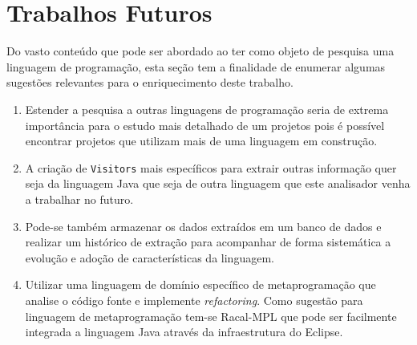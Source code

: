 

\section{Trabalhos Futuros}
Do vasto conte\'{u}do que pode ser abordado ao ter como objeto de pesquisa uma linguagem de programa\c{c}\~{a}o,  esta se\c{c}\~{a}o tem a finalidade de enumerar algumas sugest\~{o}es relevantes para o enriquecimento deste trabalho.

\begin{enumerate}
	\item Estender a pesquisa a outras linguagens de programa\c{c}\~{a}o seria de extrema import\^{a}ncia para o estudo mais detalhado de um projetos pois \'{e} poss\'{i}vel encontrar projetos que utilizam mais de uma linguagem em constru\c{c}\~{a}o.

	\item A cria\c{c}\~{a}o de \texttt{Visitors} mais espec\'{i}ficos para extrair outras informa\c{c}\~{a}o quer seja da linguagem Java que seja de outra linguagem que este analisador venha a trabalhar no futuro.

	\item Pode-se tamb\'{e}m armazenar os dados extra\'{i}dos em um banco de dados e realizar um hist\'{o}rico de extra\c{c}\~{a}o para acompanhar de forma sistem\'{a}tica a evolu\c{c}\~{a}o e ado\c{c}\~{a}o de caracter\'{i}sticas da linguagem.

	\item Utilizar uma linguagem de dom\'{i}nio espec\'{i}fico de metaprograma\c{c}\~{a}o que analise o c\'{o}digo fonte e implemente \textit{refactoring}. Como sugest\~{a}o para linguagem de metaprograma\c{c}\~{a}o tem-se Racal-MPL que pode ser facilmente integrada a linguagem Java atrav\'{e}s da infraestrutura do Eclipse.

\end{enumerate}

